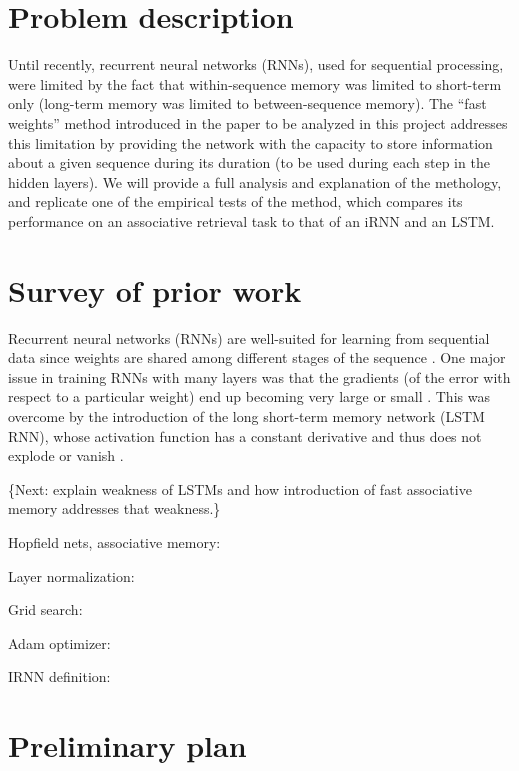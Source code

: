 \section{Problem description}

Until recently, recurrent neural networks (RNNs), used for sequential processing, were limited by the fact that within-sequence memory was limited to short-term only (long-term memory was limited to between-sequence memory). The ``fast weights'' method introduced in the paper to be analyzed in this project \cite{NIPS2016_6057} addresses this limitation by providing the network with the capacity to store information about a given sequence during its duration (to be used during each step in the hidden layers). We will provide a full analysis and explanation of the methology, and replicate one of the empirical tests of the method, which compares its performance on an associative retrieval task to that of an iRNN and an LSTM.

\section{Survey of prior work}

Recurrent neural networks (RNNs) are well-suited for learning from sequential data since weights are shared among different stages of the sequence \cite[p. 373]{Goodfellow-et-al-2016}. One major issue in training RNNs with many layers was that the gradients (of the error with respect to a particular weight) end up becoming very large or small \cite[p. 16]{DBLP:journals/nn/Schmidhuber15}. This was overcome by the introduction of the long short-term memory network (LSTM RNN), whose activation function has a constant derivative and thus does not explode or vanish \cite[p. 19]{DBLP:journals/nn/Schmidhuber15}.

\{Next: explain weakness of LSTMs and how introduction of fast associative memory addresses that weakness.\}

Hopfield nets, associative memory: \cite{Mackay03informationtheory}

Layer normalization: \cite{1607.06450}

Grid search: \cite{Goodfellow-et-al-2016}

Adam optimizer: \cite{1412.6980}

IRNN definition: \cite{1511.03771}

\section{Preliminary plan}

